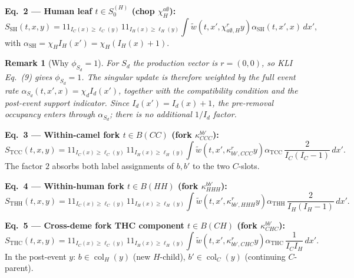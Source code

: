 \documentclass[11pt]{article}
\newcommand{\col}{\operatorname{col}}
\newcommand{\ind}{1\!\!1}
\newcommand{\rw}{\widetilde{w}}  %
\theoremstyle{plain}
\newtheorem{remark}{Remark}[section]
\begin{document}
\textbf{Eq.~2 --- Human leaf $t\in S^{(H)}_0$ (chop $\chi^{a\emptyset}_H$):}
\begin{equation}
S_{\mathrm{SH}}(t,x,y)=\ind_{I_C(x)\ge\ell_C(y)}\,\ind_{I_H(x)\ge\ell_H(y)}\int \rw\!\left(t,x',\chi^r_{a\emptyset,H}y\right)\alpha_{\mathrm{SH}}(t,x',x)\,
dx',
\end{equation}
with $\alpha_{\mathrm{SH}}=\chi_H I_H(x')=\chi_H(I_H(x)+1)$.

\begin{remark}[Why $\phi_{S_d}=1$]
For $S_d$ the production vector is $r=(0,0)$, so KLI Eq.~(9) gives $\phi_{S_d}=1$. The singular
update is therefore weighted by the full event rate $\alpha_{S_d}(t,x',x)=\chi_d I_d(x')$, together
with the compatibility condition and the post-event support indicator. Since $I_d(x')=I_d(x)+1$, the
pre-removal occupancy enters through $\alpha_{S_d}$; there is no additional $1/I_d$ factor.
\end{remark}

\textbf{Eq.~3 --- Within-camel fork $t\in B(CC)$ (fork $\kappa^{bb'}_{CCC}$):}
\begin{equation}
S_{\mathrm{TCC}}(t,x,y)=\ind_{I_C(x)\ge\ell_C(y)}\,\ind_{I_H(x)\ge\ell_H(y)}\int \rw\!\left(t,x',\kappa^r_{bb',CCC}y\right)\alpha_{\mathrm{TCC}}\,
\frac{2}{I_C(I_C-1)}\,dx'.
\end{equation}
The factor $2$ absorbs both label assignments of $b,b'$ to the two $C$-slots.

\textbf{Eq.~4 --- Within-human fork $t\in B(HH)$ (fork $\kappa^{bb'}_{HHH}$):}
\begin{equation}
S_{\mathrm{THH}}(t,x,y)=\ind_{I_C(x)\ge\ell_C(y)}\,\ind_{I_H(x)\ge\ell_H(y)}\int \rw\!\left(t,x',\kappa^r_{bb',HHH}y\right)\alpha_{\mathrm{THH}}\,
\frac{2}{I_H(I_H-1)}\,dx'.
\end{equation}

\textbf{Eq.~5 --- Cross-deme fork THC component $t\in B(CH)$ (fork $\kappa^{bb'}_{CHC}$):}
\begin{equation}
S_{\mathrm{THC}}(t,x,y)=\ind_{I_C(x)\ge\ell_C(y)}\,\ind_{I_H(x)\ge\ell_H(y)}\int \rw\!\left(t,x',\kappa^r_{bb',CHC}y\right)\alpha_{\mathrm{THC}}\,
\frac{1}{I_CI_H}\,dx'.
\end{equation}
In the post-event $y$: $b\in\col_H(y)$ (new $H$-child), $b'\in\col_C(y)$ (continuing $C$-parent).
\end{document}
